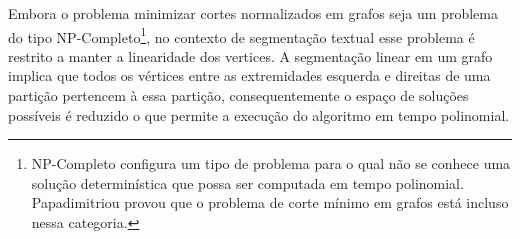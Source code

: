 Embora o problema minimizar cortes normalizados em grafos seja um problema do tipo NP-Completo\footnote{NP-Completo configura um tipo de problema para o qual não se conhece uma solução determinística que possa ser computada em tempo polinomial. Papadimitriou provou que o problema de corte mínimo em grafos está incluso nessa categoria.}, no contexto de segmentação textual esse problema é restrito a manter a linearidade dos vertices. A segmentação linear em um grafo implica que todos os vértices entre as extremidades esquerda e direitas de uma partição pertencem à essa partição, consequentemente o espaço de soluções possíveis é reduzido o que permite a execução do algoritmo em tempo polinomial.  

















 
